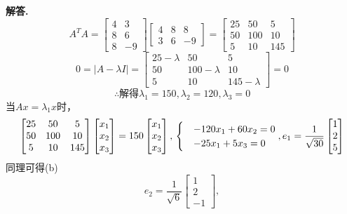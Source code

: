 \documentclass[12pt, a4paper, oneside]{ctexart}
\newenvironment{solution}{\par\noindent\textbf{解答. }}{\par}
\begin{document}
\begin{solution}
$$
A^TA=
    \begin{bmatrix}
        4 & 3 \\
        8 & 6\\
        8&-9
        \end{bmatrix}
        \begin{bmatrix}
            4 & 8 & 8 \\
            3 & 6 & -9
            \end{bmatrix}
        =            \begin{bmatrix}
            25 & 50 & 5 \\
            50 & 100 & 10\\
            5 & 10 & 145
            \end{bmatrix}
$$
$$
0=|A-\lambda I|=
\begin{bmatrix}
    25-\lambda & 50 & 5 \\
    50 & 100-\lambda & 10\\
    5 & 10 & 145-\lambda
    \end{bmatrix}=0
$$
$$
\therefore \text{解得} \lambda_1=150,\lambda_2=120,\lambda_3=0
$$
当$Ax=\lambda_1 x$时，
$$
\begin{bmatrix}
    25 & 50 & 5 \\
    50 & 100 & 10\\
    5 & 10 & 145
    \end{bmatrix}
\begin{bmatrix}
x_1\\
x_2\\
x_3
\end{bmatrix}=150
\begin{bmatrix}
x_1\\
x_2\\
x_3
\end{bmatrix},\\
\begin{cases}
    &-120x_1+60x_2=0\\
    &-25x_1+5x_3=0
\end{cases},\\
e_1=\frac{1}{\sqrt{30}}\begin{bmatrix}
    1\\
    2\\
    5
    \end{bmatrix}
$$
同理可得(b)
$$
e_2=\frac{1}{\sqrt{6}}\begin{bmatrix}
    1\\
    2\\
    -1
    \end{bmatrix},
$$
\end{solution}
\end{document}
